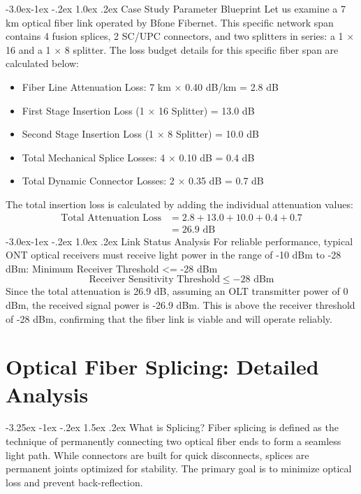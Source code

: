 \documentclass[11pt,a4paper]{report}
\makeatletter
\renewcommand{\section}{\@startsection{section}{1}{\z@}%
  {-3.25ex \@plus -1ex \@minus -.2ex}%
  {1.5ex \@plus.2ex}%
  {\normalfont\Large\bfseries\color{primaryColor}}}
\renewcommand{\subsection}{\@startsection{subsection}{2}{\z@}%
  {-3.0ex\@plus -1ex \@minus -.2ex}%
  {1.0ex \@plus .2ex}%
  {\normalfont\large\bfseries\color{secondaryColor}}}
\makeatother
\begin{document}
\subsection{Case Study Parameter Blueprint}
Let us examine a 7 km optical fiber link operated by Bfone Fibernet. This specific network span contains 4 fusion splices, 2 SC/UPC connectors, and two splitters in series: a 1 $\times$ 16 and a 1 $\times$ 8 splitter. The loss budget details for this specific fiber span are calculated below:
\begin{itemize}
  \item Fiber Line Attenuation Loss: 7 km $\times$ 0.40 dB/km = 2.8 dB
  \item First Stage Insertion Loss (1 $\times$ 16 Splitter) = 13.0 dB
  \item Second Stage Insertion Loss (1 $\times$ 8 Splitter) = 10.0 dB
  \item Total Mechanical Splice Losses: 4 $\times$ 0.10 dB = 0.4 dB
  \item Total Dynamic Connector Losses: 2 $\times$ 0.35 dB = 0.7 dB
\end{itemize}
The total insertion loss is calculated by adding the individual attenuation values:
\begin{align*} \text{Total Attenuation Loss} &= 2.8 + 13.0 + 10.0 + 0.4 + 0.7 \\ &= 26.9\text{ dB} \end{align*}
\subsection{Link Status Analysis}
For reliable performance, typical ONT optical receivers must receive light power in the range of -10 dBm to -28 dBm: Minimum Receiver Threshold <= -28 dBm
\begin{equation}\text{Receiver Sensitivity Threshold} \le -28\text{ dBm}\end{equation}
Since the total attenuation is 26.9 dB, assuming an OLT transmitter power of 0 dBm, the received signal power is -26.9 dBm. This is above the receiver threshold of -28 dBm, confirming that the fiber link is viable and will operate reliably.
\chapter{Optical Fiber Splicing: Detailed Analysis}
\section{What is Splicing?}
Fiber splicing is defined as the technique of permanently connecting two optical fiber ends to form a seamless light path. While connectors are built for quick disconnects, splices are permanent joints optimized for stability. The primary goal is to minimize optical loss and prevent back-reflection.
\end{document}
